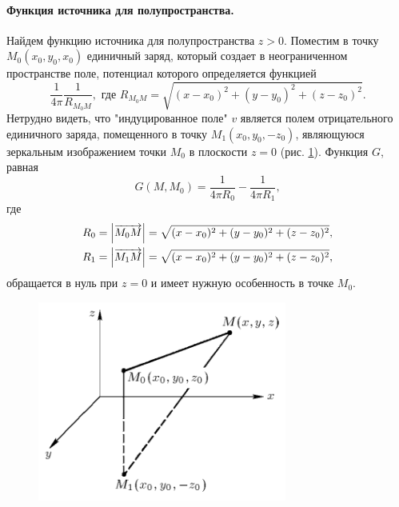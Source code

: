 \paragraph{Функция источника для полупространства.}

Найдем функцию источника для полупространства $z > 0$. Поместим в точку $M_0(x_0, y_0, x_0)$ единичный заряд, который создает в неограниченном пространстве поле, потенциал которого определяется функцией 
\begin{equation*}
	\frac{1}{4 \pi} \frac{1}{R_{M_0 M}}, \text{ где } R_{M_0 M} = \sqrt{(x - x_0)^2 + (y - y_0)^2 + (z - z_0)^2}.
\end{equation*}
Нетрудно видеть, что "индуцированное поле" $v$ является полем отрицательного единичного заряда, помещенного в точку $M_1(x_0, y_0, -z_0)$, являющуюся зеркальным изображением точки $M_0$ в плоскости $z = 0$ (рис. \ref{halfdim_green}). 
Функция $G$, равная
\begin{equation*}
	G(M, M_0) = \frac{1}{4 \pi R_0} - \frac{1}{4 \pi R_1},
\end{equation*}
где
\begin{align*}
	R_0 = \abs{\overrightarrow{M_0 M}} = \sqrt{(x - x_0)^2 + (y - y_0)^2 + (z - z_0)^2}, \\
	R_1 = \abs{\overrightarrow{M_1 M}} = \sqrt{(x - x_0)^2 + (y - y_0)^2 + (z - z_0)^2}, \\
\end{align*}
обращается в нуль при $z = 0$ и имеет нужную особенность в точке $M_0$.

\begin{figure}[H]
	\centering
	\includegraphics[width=0.4\linewidth]{img/halfdim_green}
	\caption{}
	\label{halfdim_green}
\end{figure}